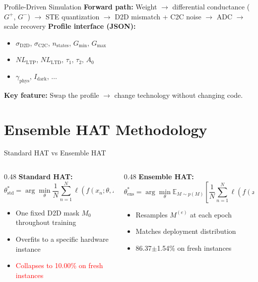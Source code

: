\documentclass[aspectratio=169,11pt]{beamer}
\begin{document}
\begin{frame}{Profile-Driven Simulation}
  \textbf{Forward path:} Weight $\rightarrow$ differential conductance ($G^+$, $G^-$) $\rightarrow$ STE quantization $\rightarrow$ D2D mismatch + C2C noise $\rightarrow$ ADC $\rightarrow$ scale recovery
  \vfill
  \textbf{Profile interface (JSON):}
  \begin{itemize}
    \item $\sigma_{\text{D2D}}$, $\sigma_{\text{C2C}}$, $n_{\text{states}}$, $G_{\min}$, $G_{\max}$
    \item $NL_{\text{LTP}}$, $NL_{\text{LTD}}$, $\tau_1$, $\tau_2$, $A_0$
    \item $\gamma_{\text{phys}}$, $I_{\text{dark}}$, $\ldots$
  \end{itemize}
  \vfill
  \textbf{Key feature:} Swap the profile $\rightarrow$ change technology without changing code.
\end{frame}

\section{Ensemble HAT Methodology}

\begin{frame}{Standard HAT vs Ensemble HAT}
  \begin{columns}
    \begin{column}{0.48\textwidth}
      \textbf{Standard HAT:}
      \begin{equation*}
        \theta^*_{\text{std}} = \arg\min_\theta \frac{1}{N}\sum_{n=1}^N \ell(f(x_n; \theta, M_0), y_n)
      \end{equation*}
      \begin{itemize}
        \item One fixed D2D mask $M_0$ throughout training
        \item Overfits to a specific hardware instance
        \item \textcolor{red}{Collapses to 10.00\% on fresh instances}
      \end{itemize}
    \end{column}
    \begin{column}{0.48\textwidth}
      \textbf{Ensemble HAT:}
      \begin{equation*}
        \theta^*_{\text{ens}} = \arg\min_\theta \mathbb{E}_{M \sim p(M)}\!\left[\frac{1}{N}\sum_{n=1}^N \ell(f(x_n; \theta, M), y_n)\right]
      \end{equation*}
      \begin{itemize}
        \item Resamples $M^{(e)}$ at each epoch
        \item Matches deployment distribution
        \item \textcolor{green!60!black}{86.37$\pm$1.54\% on fresh instances}
      \end{itemize}
    \end{column}
  \end{columns}
\end{frame}
\end{document}
